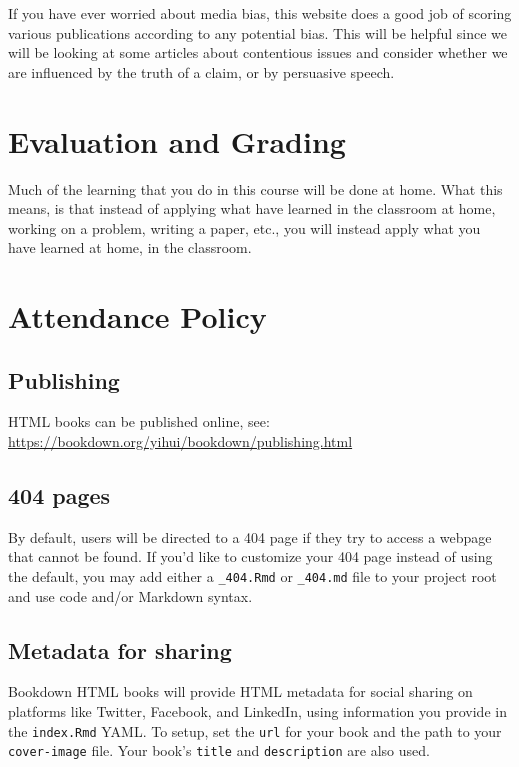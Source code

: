 \documentclass[
]{book}
\begin{document}
If you have ever worried about media bias, this website does a good job of scoring various publications according to any potential bias. This will be helpful since we will be looking at some articles about contentious issues and consider whether we are influenced by the truth of a claim, or by persuasive speech.

\hypertarget{evaluation-and-grading}{%
\chapter{Evaluation and Grading}\label{evaluation-and-grading}}

Much of the learning that you do in this course will be done at home. What this means, is that instead of applying what have learned in the classroom at home, working on a problem, writing a paper, etc., you will instead apply what you have learned at home, in the classroom.

\hypertarget{attendance-policy}{%
\chapter{Attendance Policy}\label{attendance-policy}}

\hypertarget{publishing}{%
\section{Publishing}\label{publishing}}

HTML books can be published online, see: \url{https://bookdown.org/yihui/bookdown/publishing.html}

\hypertarget{pages}{%
\section{404 pages}\label{pages}}

By default, users will be directed to a 404 page if they try to access a webpage that cannot be found. If you'd like to customize your 404 page instead of using the default, you may add either a \texttt{\_404.Rmd} or \texttt{\_404.md} file to your project root and use code and/or Markdown syntax.

\hypertarget{metadata-for-sharing}{%
\section{Metadata for sharing}\label{metadata-for-sharing}}

Bookdown HTML books will provide HTML metadata for social sharing on platforms like Twitter, Facebook, and LinkedIn, using information you provide in the \texttt{index.Rmd} YAML. To setup, set the \texttt{url} for your book and the path to your \texttt{cover-image} file. Your book's \texttt{title} and \texttt{description} are also used.
\end{document}
